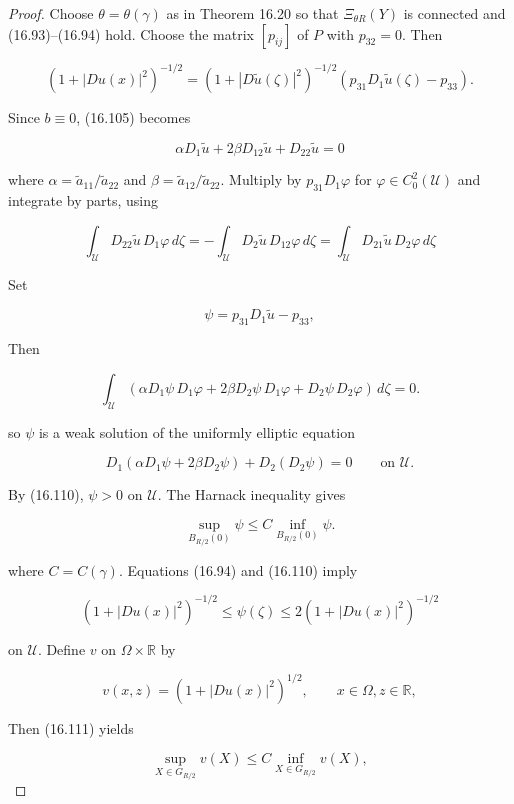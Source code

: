 \begin{proof}
\sketch Choose $\theta=\theta(\gamma)$ as in Theorem 16.20 so that
$\Xi_{\theta R}(Y)$ is connected and (16.93)--(16.94) hold. Choose the matrix
$[p_{ij}]$ of $P$ with $p_{32}=0$. Then

\begin{equation}
(1+|Du(x)|^2)^{-1/2} = (1+|D\tilde u(\zeta)|^2)^{-1/2}(p_{31}D_1\tilde u(\zeta)-p_{33}).
\tag{16.110}
\end{equation}

Since $b\equiv0$, (16.105) becomes

\[
\alpha D_1 \tilde u + 2\beta D_{12}\tilde u + D_{22}\tilde u = 0
\]

where $\alpha=\tilde a_{11}/\tilde a_{22}$ and
$\beta=\tilde a_{12}/\tilde a_{22}$. Multiply by $p_{31}D_1\varphi$ for
$\varphi\in C_0^2(\mathcal U)$ and integrate by parts, using

\[
\int_{\mathcal U} D_{22}\tilde u\,D_1\varphi\,d\zeta
= -\int_{\mathcal U} D_2\tilde u\,D_{12}\varphi\,d\zeta
= \int_{\mathcal U} D_{21}\tilde u\,D_2\varphi\,d\zeta
\]

Set

\[
\psi = p_{31}D_1\tilde u - p_{33},
\]

Then

\[
\int_{\mathcal U} \left(\alpha D_1\psi\,D_1\varphi + 2\beta D_2\psi\,D_1\varphi + D_2\psi\,D_2\varphi\right)\,d\zeta = 0.
\]

so $\psi$ is a weak solution of the uniformly elliptic equation

\[
D_1(\alpha D_1\psi + 2\beta D_2\psi) + D_2(D_2\psi)=0
\qquad \text{on } \mathcal U.
\]

By (16.110), $\psi>0$ on $\mathcal U$. The Harnack inequality gives

\begin{equation}
\sup_{B_{R/2}(0)} \psi \le C \inf_{B_{R/2}(0)} \psi.
\tag{16.111}
\end{equation}



where $C=C(\gamma)$. Equations (16.94) and (16.110) imply

\[
(1+|Du(x)|^2)^{-1/2}\leq \psi(\zeta)\leq 2(1+|Du(x)|^2)^{-1/2}
\]

on $\mathcal U$. Define $v$ on $\Omega\times\mathbb R$ by

\[
v(x,z)=(1+|Du(x)|^2)^{1/2}, \qquad x\in \Omega, z\in \mathbb{R},
\]

Then (16.111) yields

\[
\sup_{X\in G_{R/2}} v(X)\leq C \inf_{X\in G_{R/2}} v(X),
\]


\end{proof}
